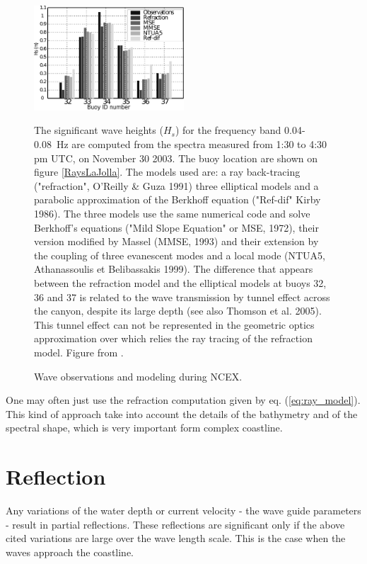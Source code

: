 \begin{figure}
\centerline{\includegraphics[width=0.5\textwidth]{FIGS_CH_SHALLOWLIN/comparison_at_all_sites.pdf}}
  \caption{Wave observations and modeling during NCEX.}
  {The significant wave heights ($H_s$) for the frequency band 
   0.04-0.08~Hz are computed from the spectra measured from 1:30 to
   4:30 pm UTC, on November 30 2003. The buoy location are shown on figure
   \ref{RaysLaJolla}. The models used are: a ray back-tracing ("refraction", O'Reilly \& Guza 1991) 
   three elliptical models and a parabolic approximation of the Berkhoff equation
   ("Ref-dif" Kirby 1986\nocite{Kirby1986c}). The three models use the same numerical
   code and solve Berkhoff's equations ("Mild Slope Equation" or MSE,
  1972\nocite{Berkhoff1972}), their version modified by Massel  (MMSE,
  1993\nocite{Massel1993}) and their extension by the coupling of three evanescent modes and a local mode
  (NTUA5, Athanassoulis et Belibassakis 1999\nocite{Athanassoulis&Belibassakis1999}).
  The difference that appears between the refraction model and the elliptical models 
  at buoys 32, 36 and 37 is related to the wave transmission by tunnel effect across the canyon,
  despite its large depth (see also Thomson et al. 2005\nocite{Thomson&al.2005}). This tunnel effect
  can not be represented in the geometric optics approximation over which relies the ray tracing of the
  refraction model. Figure from \cite{Magne&al.2007}.}
 \label{NCEXcomp}
  \end{figure}

One may often just use the refraction computation given by eq. (\ref{eq:ray_model}).
This kind of approach take into account the details of the bathymetry
and of the spectral shape, which is very important form complex
coastline.

\section{Reflection}
Any variations of the water depth or current velocity - the wave guide parameters - result in partial reflections. These reflections are significant
only if the above cited variations are large over the wave length scale. This is the case when the waves approach the coastline.

